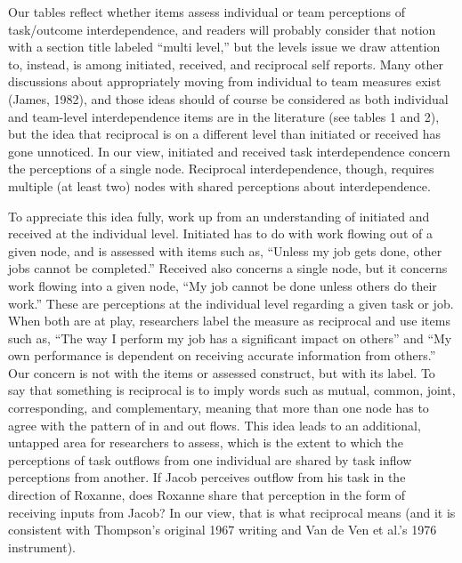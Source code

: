 \documentclass[english,,man]{apa6}
\theoremstyle{definition}
\theoremstyle{definition}
\theoremstyle{definition}
\theoremstyle{remark}
\begin{document}
Our tables reflect whether items assess individual or team perceptions
of task/outcome interdependence, and readers will probably consider that
notion with a section title labeled \enquote{multi level,} but the
levels issue we draw attention to, instead, is among initiated,
received, and reciprocal self reports. Many other discussions about
appropriately moving from individual to team measures exist (James,
1982), and those ideas should of course be considered as both individual
and team-level interdependence items are in the literature (see tables 1
and 2), but the idea that reciprocal is on a different level than
initiated or received has gone unnoticed. In our view, initiated and
received task interdependence concern the perceptions of a single node.
Reciprocal interdependence, though, requires multiple (at least two)
nodes with shared perceptions about interdependence.

To appreciate this idea fully, work up from an understanding of
initiated and received at the individual level. Initiated has to do with
work flowing out of a given node, and is assessed with items such as,
\enquote{Unless my job gets done, other jobs cannot be completed.}
Received also concerns a single node, but it concerns work flowing into
a given node, \enquote{My job cannot be done unless others do their
work.} These are perceptions at the individual level regarding a given
task or job. When both are at play, researchers label the measure as
reciprocal and use items such as, \enquote{The way I perform my job has
a significant impact on others} and \enquote{My own performance is
dependent on receiving accurate information from others.} Our concern is
not with the items or assessed construct, but with its label. To say
that something is reciprocal is to imply words such as mutual, common,
joint, corresponding, and complementary, meaning that more than one node
has to agree with the pattern of in and out flows. This idea leads to an
additional, untapped area for researchers to assess, which is the extent
to which the perceptions of task outflows from one individual are shared
by task inflow perceptions from another. If Jacob perceives outflow from
his task in the direction of Roxanne, does Roxanne share that perception
in the form of receiving inputs from Jacob? In our view, that is what
reciprocal means (and it is consistent with Thompson's original 1967
writing and Van de Ven et al.'s 1976 instrument).
\end{document}
